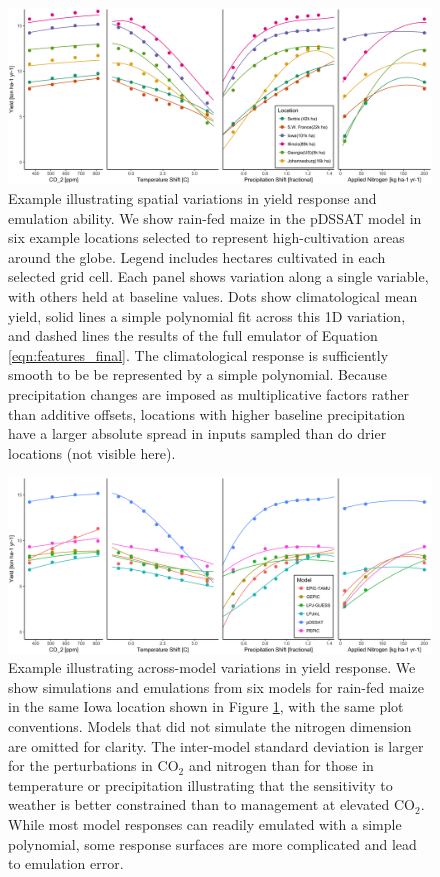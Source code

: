 \documentclass[preprint, 5p, times, twocolumn]{elsarticle}
\begin{document}
\begin{figure}[!h]
\centering
    \includegraphics[width=0.95\linewidth]{regression_areas.png}
    \caption{Example illustrating spatial variations in yield response and emulation ability. We show rain-fed maize in the pDSSAT model in six example locations selected to represent high-cultivation areas around the globe. Legend includes hectares cultivated in each selected grid cell. Each panel shows variation along a single variable, with others held at baseline values. Dots show climatological mean yield, solid lines a simple polynomial fit across this 1D variation, and dashed lines the results of the full emulator of Equation \ref{eqn:features_final}. The climatological response is sufficiently smooth to be be represented by a simple polynomial. Because precipitation changes are imposed as multiplicative factors rather than additive offsets, locations with higher baseline precipitation have a larger absolute spread in inputs sampled than do drier locations (not visible here).}
   \label{fig:regression}
\end{figure}

\begin{figure}[!h]
\centering
    \includegraphics[width=0.95\linewidth]{regression_model.png}
    \caption{Example illustrating across-model variations in yield response. We show simulations and emulations from six models for rain-fed maize in the same Iowa location shown in Figure \ref{fig:regression}, with the same plot conventions. Models that did not simulate the nitrogen dimension are omitted for clarity. The inter-model standard deviation is larger for the perturbations in CO$_2$ and nitrogen than for those in temperature or precipitation illustrating that the sensitivity to weather is better constrained than to management at elevated CO$_2$. While most model responses can readily emulated with a simple polynomial, some response surfaces are more complicated and lead to emulation error.}
   \label{fig:regression_iowa}
\end{figure}
\end{document}
